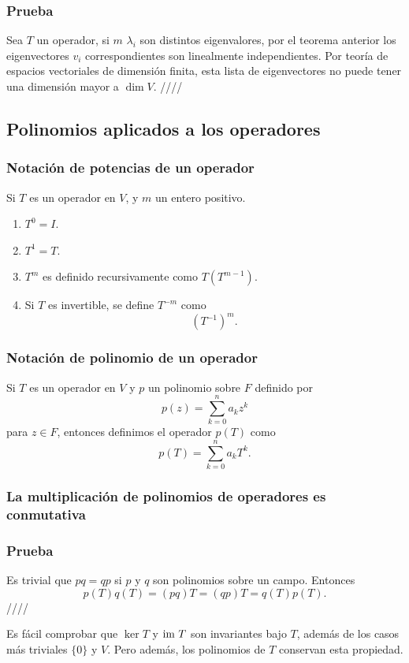 \documentclass{article}
\begin{document}
\subsubsection*{Prueba}
Sea $T$ un operador, si $m$ $\lambda_i$ son distintos 
eigenvalores, por el teorema anterior los eigenvectores
$v_i$ correspondientes son linealmente independientes.
Por teoría de espacios vectoriales de dimensión finita,
esta lista de eigenvectores no puede tener una dimensión
mayor a $\dim V$. \hfill ////

\subsection{Polinomios aplicados a los operadores}
\subsubsection{Notación de potencias de un operador}
Si $T$ es un operador en $V$, y $m$ un entero positivo.
\begin{enumerate}
    \item $T^0= I$.
    \item $T^1 = T$.
    \item $T^m$ es definido recursivamente como $T(T^{m-1})$.
    \item Si $T$ es invertible, se define $T^{-m}$ como
    $$(T^{-1})^m.$$
\end{enumerate}

\subsubsection{Notación de polinomio de un operador}
Si $T$ es un operador en $V$ y $p$ un polinomio sobre $F$
definido por $$p(z)=\sum^n_{k=0}a_k z^k$$
para $z\in F$, entonces definimos el operador $p(T)$ como
$$p(T)=\sum^n_{k=0}a_k T^k.$$

\subsubsection{La multiplicación de polinomios de operadores es conmutativa}
\subsubsection*{Prueba}
Es trivial que $pq=qp$ si $p$ y $q$ son polinomios sobre un
campo. Entonces $$p(T)q(T) = (pq)T = (qp)T = q(T)p(T).$$
\hfill ////

Es fácil comprobar que $\ker T$ y $\text{im } T$ son invariantes bajo
$T$, además de los casos más triviales $\{0\}$ y $V$.
Pero además, los polinomios de $T$ conservan esta propiedad.
\newpage
\end{document}

